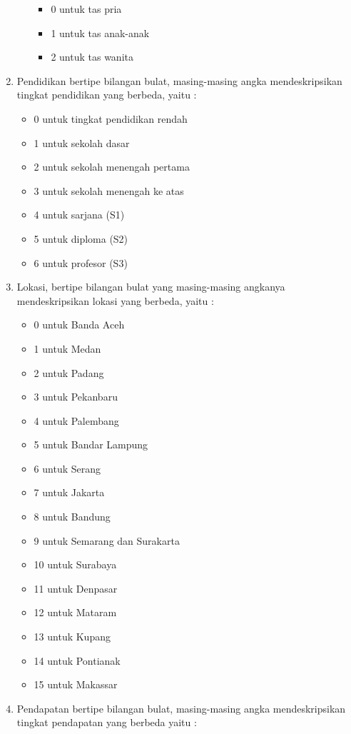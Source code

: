 \begin{enumerate}
\begin{itemize}
\begin{itemize}
					\item 0 untuk tas pria
					\item 1 untuk tas anak-anak
					\item 2 untuk tas wanita
				\end{itemize}
		\end{itemize}
		\item Pendidikan bertipe bilangan bulat, masing-masing angka mendeskripsikan tingkat pendidikan yang berbeda, yaitu :
		\begin{itemize}
					\item 0 untuk tingkat pendidikan rendah
					\item 1 untuk sekolah dasar
					\item 2 untuk sekolah menengah pertama
					\item 3 untuk sekolah menengah ke atas
					\item 4 untuk sarjana (S1)
					\item 5 untuk diploma (S2)
					\item 6 untuk profesor (S3)
				\end{itemize}
		\item Lokasi, bertipe bilangan bulat yang masing-masing angkanya mendeskripsikan lokasi yang berbeda, yaitu :
			\begin{itemize}
				\item 0 untuk Banda Aceh
				\item 1 untuk Medan
				\item 2 untuk Padang
				\item 3 untuk Pekanbaru
				\item 4 untuk Palembang
				\item 5 untuk Bandar Lampung
				\item 6 untuk Serang
				\item 7 untuk Jakarta
				\item 8 untuk Bandung
				\item 9 untuk Semarang dan Surakarta
				\item 10 untuk Surabaya
				\item 11 untuk Denpasar
				\item 12 untuk Mataram
				\item 13 untuk Kupang
				\item 14 untuk Pontianak
				\item 15 untuk Makassar
			\end{itemize}
		\item Pendapatan bertipe bilangan bulat, masing-masing angka mendeskripsikan tingkat pendapatan yang berbeda yaitu :

\end{enumerate}
